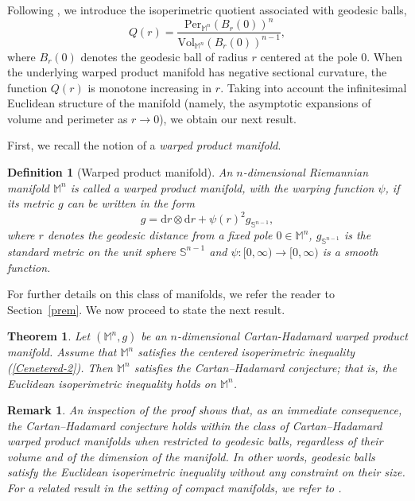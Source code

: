 \documentclass[a4paper,11pt,reqno]{amsart}
\renewcommand\eqref[1]{(\ref{#1})}
\theoremstyle{plain}
\newtheorem{theorem}{Theorem}[section]
\newtheorem{remark}{Remark}[section]
\newtheorem{definition}{Definition}[section]
\numberwithin{equation}{section} \allowdisplaybreaks
\newcommand{\m}{\mathbb{M}^n}
\newcommand{\sn}{\mathbb{S}^{n-1}}
\begin{document}
Following \cite{Yau}, we introduce the isoperimetric quotient associated with geodesic balls,
\begin{equation}\label{eq:isoperimetric-quotient}
    Q(r)
    = \frac{\text{Per}_{\m}(B_r(0))^n}{\text{Vol}_{\m}(B_r(0))^{n-1}},
\end{equation}
where $B_r(0)$ denotes the geodesic ball of radius $r$ centered at the pole $0$.
When the underlying warped product manifold has negative sectional curvature, the function $Q(r)$ is monotone increasing in $r$. 
Taking into account the infinitesimal Euclidean structure of the manifold (namely, the asymptotic expansions of volume and perimeter as $r \to 0$), we obtain our next result. 

First, we recall the notion of a \emph{warped product manifold}.

\begin{definition}[Warped product manifold]
    An $n$-dimensional Riemannian manifold $\m$ is called a warped product manifold, with the warping function $\psi$, if its metric $g$ can be written in the form
    \begin{equation*}
        g=\mathrm{d}r\otimes \mathrm{d}r+\psi(r)^2 g_{\sn},
    \end{equation*}
    where $r$ denotes the geodesic distance from a fixed pole $0\in \m$, $g_{\sn}$ is the standard metric on the unit sphere $\sn$ and $\psi: [0,\infty) \to [0,\infty)$ is a smooth function.
\end{definition}
For further details on this class of manifolds, we refer the reader to Section~\ref{prem}. We now proceed to state the next result.


\begin{theorem}\label{second}
Let $(\m,g)$ be an $n$-dimensional Cartan-Hadamard warped product manifold. 
Assume that $\m$ satisfies the centered isoperimetric inequality \eqref{Cenetered-2}.
Then $\m$ satisfies the Cartan--Hadamard conjecture; that is, the Euclidean isoperimetric inequality holds on $\m$.
\end{theorem}

\medskip

\begin{remark}
{\rm 
An inspection of the proof shows that, as an immediate consequence, the Cartan–Hadamard conjecture holds within the class of Cartan–Hadamard warped product manifolds when restricted to geodesic balls, regardless of their volume and of the dimension of the manifold. In other words, geodesic balls satisfy the Euclidean isoperimetric inequality without any constraint on their size. For a related result in the setting of compact manifolds, we refer to \cite[Theorem~3.4]{MJ}.
 }
\end{remark}
\end{document}
